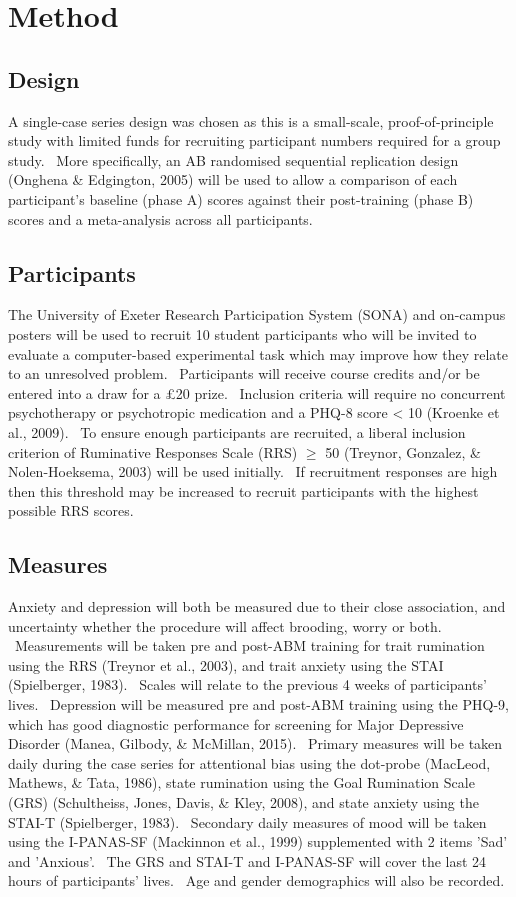 \documentclass[man,a4paper,biblatex]{apa6}
\begin{document}
\section{Method}
\subsection{Design}
A single-case series design was chosen as this is a small-scale, proof-of-principle study with limited funds for recruiting participant numbers required for a group study. \ More specifically, an AB randomised sequential replication design (Onghena \& Edgington, 2005) will be used to allow a comparison of each participant's baseline (phase A) scores against their post-training (phase B) scores and a meta-analysis across all participants.

\subsection{Participants}
The University of Exeter Research Participation System (SONA) and on-campus posters will be used to recruit 10 student participants who will be invited to evaluate a computer-based experimental task which may improve how they relate to an unresolved problem. \ Participants will receive course credits and/or be entered into a draw for a {\pounds}20 prize. \ Inclusion criteria will require no concurrent psychotherapy or psychotropic medication and a PHQ-8 score {\textless} 10 (Kroenke et al., 2009). \ To ensure enough participants are recruited, a liberal inclusion criterion of Ruminative Responses Scale (RRS) ${\geq}$ 50 (Treynor, Gonzalez, \& Nolen-Hoeksema, 2003) will be used initially. \ If recruitment responses are high then this threshold may be increased to recruit participants with the highest possible RRS scores.

\subsection{Measures}
Anxiety and depression will both be measured due to their close association, and uncertainty whether the procedure will affect brooding, worry or both. \ Measurements will be taken pre and post-ABM training for trait rumination using the RRS (Treynor et al., 2003), and trait anxiety using the STAI (Spielberger, 1983). \ Scales will relate to the previous 4 weeks of participants' lives. \ Depression will be measured pre and post-ABM training using the PHQ-9, which has good diagnostic performance for screening for Major Depressive Disorder (Manea, Gilbody, \& McMillan, 2015). \ Primary measures will be taken daily during the case series for attentional bias using the dot-probe (MacLeod, Mathews, \& Tata, 1986), state rumination using the Goal Rumination Scale (GRS) (Schultheiss, Jones, Davis, \& Kley, 2008), and state anxiety using the STAI-T (Spielberger, 1983). \ Secondary daily measures of mood will be taken using the I-PANAS-SF (Mackinnon et al., 1999) supplemented with 2 items 'Sad' and 'Anxious'. \ The GRS and STAI-T and I-PANAS-SF will cover the last 24 hours of participants' lives. \ Age and gender demographics will also be recorded.
\end{document}

